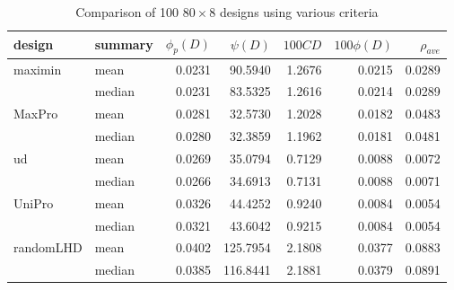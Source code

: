 \documentclass [PhD] {package/uclathes}
\begin{document}
\begin{table}[!h]
\centering
\caption{\label{tab:comparison}Comparison of 100 $80\times 8$ designs using various criteria}
\centering
\begin{tabular}[t]{llrrrrr}
\toprule
\textbf{design} & \textbf{summary} & \textbf{$\phi_p(D)$} & \textbf{$\psi(D)$} & \textbf{$100CD$} & \textbf{$100\phi(D)$} & \textbf{$\rho_{ave}$}\\
\midrule
maximin & mean & 0.0231 & 90.5940 & 1.2676 & 0.0215 & 0.0289\\
\cmidrule{2-7}
 & median & 0.0231 & 83.5325 & 1.2616 & 0.0214 & 0.0289\\
\cmidrule{1-7}
MaxPro & mean & 0.0281 & 32.5730 & 1.2028 & 0.0182 & 0.0483\\
\cmidrule{2-7}
 & median & 0.0280 & 32.3859 & 1.1962 & 0.0181 & 0.0481\\
\cmidrule{1-7}
ud & mean & 0.0269 & 35.0794 & 0.7129 & 0.0088 & 0.0072\\
\cmidrule{2-7}
 & median & 0.0266 & 34.6913 & 0.7131 & 0.0088 & 0.0071\\
\cmidrule{1-7}
UniPro & mean & 0.0326 & 44.4252 & 0.9240 & 0.0084 & 0.0054\\
\cmidrule{2-7}
 & median & 0.0321 & 43.6042 & 0.9215 & 0.0084 & 0.0054\\
\cmidrule{1-7}
randomLHD & mean & 0.0402 & 125.7954 & 2.1808 & 0.0377 & 0.0883\\
\cmidrule{2-7}
 & median & 0.0385 & 116.8441 & 2.1881 & 0.0379 & 0.0891\\
\bottomrule
\end{tabular}
\end{table}
\end{document}
